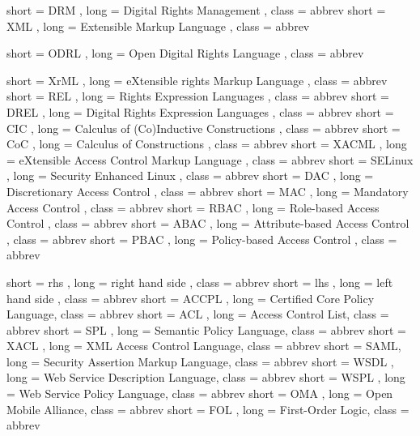{
  short = DRM ,
  long  = Digital Rights Management ,
  class = abbrev
}
{
  short = XML ,
  long  = Extensible Markup Language ,
  class = abbrev
}

{
  short = ODRL ,
  long  = Open Digital Rights Language ,
  class = abbrev
}

{
  short = XrML ,
  long  = eXtensible rights Markup Language ,
  class = abbrev
}
{
  short = REL ,
  long  = Rights Expression Languages ,
  class = abbrev
}
{
  short = DREL ,
  long  = Digital Rights Expression Languages ,
  class = abbrev
}
{
  short = CIC ,
  long  = Calculus of (Co)Inductive Constructions ,
  class = abbrev
}
{
  short = CoC ,
  long  = Calculus of Constructions ,
  class = abbrev
}
{
  short = XACML ,
  long  = eXtensible Access Control Markup Language ,
  class = abbrev
}
{
  short = SELinux ,
  long  = Security Enhanced Linux ,
  class = abbrev
}
{
  short = DAC ,
  long  = Discretionary Access Control ,
  class = abbrev
}
{
  short = MAC ,
  long  = Mandatory Access Control ,
  class = abbrev
}
{
  short = RBAC ,
  long  = Role-based Access Control ,
  class = abbrev
}
{
  short = ABAC ,
  long  = Attribute-based Access Control ,
  class = abbrev
}
{
  short = PBAC ,
  long  = Policy-based Access Control ,
  class = abbrev
}

{
  short = rhs ,
  long  = right hand side ,
  class = abbrev
}
{
  short = lhs ,
  long  = left hand side ,
  class = abbrev
}
{
  short = ACCPL ,
  long  =  Certified Core Policy Language,
  class = abbrev
}
{
  short = ACL ,
  long  =  Access Control List,
  class = abbrev
}
{
  short = SPL ,
  long  =  Semantic Policy Language,
  class = abbrev
}
{
  short = XACL ,
  long  =  XML Access Control Language,
  class = abbrev
}
{
  short = SAML,
  long  =  Security Assertion Markup Language,
  class = abbrev
}
{
  short = WSDL ,
  long  =  Web Service Description Language,
  class = abbrev
}
{
  short = WSPL ,
  long  =  Web Service Policy Language,
  class = abbrev
}
{
  short = OMA ,
  long  =  Open Mobile Alliance,
  class = abbrev
}
{
  short = FOL ,
  long  =  First-Order Logic,
  class = abbrev
}



